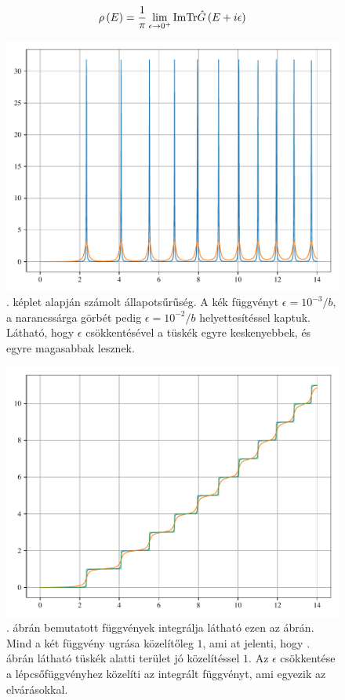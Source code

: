 \begin{equation}
	\rho\left(E\right) = \frac{1}{\pi}\lim_{\epsilon \to 0^+} \mathrm{Im}\mathrm{Tr}\hat{G}\left(E + i\epsilon\right)
	\label{green:densityeq}
\end{equation}
\begin{figure}[H]
	\includegraphics[scale=1]{./figs/dosfromgreen.pdf}
	\caption[Állapotsűrűség]{. képlet alapján számolt állapotsűrűség. A kék függvényt $\epsilon = 10^{-3}/b$, a narancssárga görbét pedig $\epsilon = 10^{-2}/b$ helyettesítéssel kaptuk. Látható, hogy $\epsilon$ csökkentésével a tüskék egyre keskenyebbek, és egyre magasabbak lesznek.}
	\label{green:állapotsűrség}
\end{figure}
\begin{figure}[H]
	\includegraphics[scale=1]{./figs/numberofstatesfromgreen.pdf}
	\caption[Állapotok száma]{. ábrán bemutatott függvények integrálja látható ezen az ábrán. Mind a két függvény ugrása közelítőleg $1$, ami at jelenti, hogy . ábrán látható tüskék alatti terület jó közelítéssel $1$. Az $\epsilon$ csökkentése a lépcsőfüggvényhez közelíti az integrált függvényt, ami egyezik az elvárásokkal.}
\end{figure}